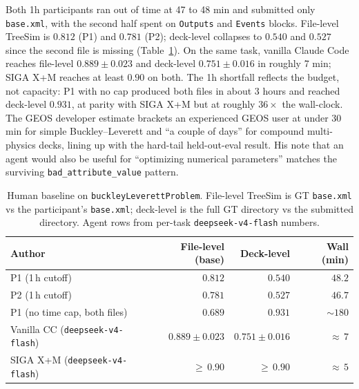 \documentclass{article}
\begin{document}
Both 1h participants ran out of time at 47 to 48 min and submitted only \texttt{base.xml}, with the second half spent on \texttt{Outputs} and \texttt{Events} blocks. File-level TreeSim is $0.812$ (P1) and $0.781$ (P2); deck-level collapses to $0.540$ and $0.527$ since the second file is missing (Table~\ref{tab:human-baseline}). On the same task, vanilla Claude Code reaches file-level $0.889 \pm 0.023$ and deck-level $0.751 \pm 0.016$ in roughly 7 min; SIGA X+M reaches at least $0.90$ on both. The 1h shortfall reflects the budget, not capacity: P1 with no cap produced both files in about 3 hours and reached deck-level $\mathbf{0.931}$, at parity with SIGA X+M but at roughly $36\times$ the wall-clock. The GEOS developer estimate brackets an experienced GEOS user at under 30 min for simple Buckley--Leverett and ``a couple of days'' for compound multi-physics decks, lining up with the hard-tail held-out-eval result. His note that an agent would also be useful for ``optimizing numerical parameters'' matches the surviving \texttt{bad\_attribute\_value} pattern.

\begin{table}[h]
  \caption{Human baseline on \texttt{buckleyLeverettProblem}. File-level TreeSim is GT \texttt{base.xml} vs the participant's \texttt{base.xml}; deck-level is the full GT directory vs the submitted directory. Agent rows from per-task \texttt{deepseek-v4-flash} numbers.}
  \label{tab:human-baseline}
  \centering
  \small
  \begin{tabular}{lrrr}
    \toprule
    \textbf{Author} & \textbf{File-level (base)} & \textbf{Deck-level} & \textbf{Wall (min)} \\
    \midrule
    P1 (1\,h cutoff)                          & $0.812$            & $0.540$            & $48.2$ \\
    P2 (1\,h cutoff)                          & $0.781$            & $0.527$            & $46.7$ \\
    P1 (no time cap, both files)              & $0.689$            & $0.931$            & ${\sim}180$ \\
    Vanilla CC (\texttt{deepseek-v4-flash})   & $0.889 \pm 0.023$  & $0.751 \pm 0.016$  & ${\approx}\,7$ \\
    SIGA X+M (\texttt{deepseek-v4-flash})     & ${\geq}\,0.90$     & ${\geq}\,0.90$     & ${\approx}\,5$ \\
    \bottomrule
  \end{tabular}
\end{table}
\end{document}
